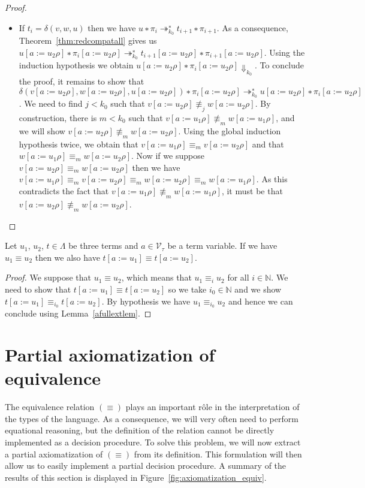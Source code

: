 \begin{proof}
\begin{itemize}
    \item If $t_i = δ(v,w,u)$ then we have ${u ∗ π_i} ↠_{k_0}^{∗} {t_{i+1} ∗
      π_{i+1}}$. As a consequence, Theorem~\ref{thm:redcompatall} gives us
      ${u[a := u_2ρ] ∗ π_i[a := u_2ρ]} ↠_{k_0}^{∗} {t_{i+1}[a := u_2ρ] ∗
      π_{i+1}[a := u_2ρ]}$. Using the induction hypothesis we obtain
      ${u[a := u_2ρ] ∗ π_i[a := u_2ρ]} {⇓}_{k_0}$. To conclude the proof, it
      remains to show that ${δ(v[a := u_2ρ],w[a := u_2ρ], u[a := u_2ρ]) ∗
      π_i[a := u_2ρ]} ↠_{k_0}^{∗} {u[a := u_2ρ] ∗ π_i[a := u_2ρ]}$.
      We need to find $j < k_0$ such that ${v[a := u_2ρ]} \not\equiv_j
      {w[a := u_2ρ]}$. By construction, there is $m < k_0$ such that
      ${v[a := u_1ρ]} \not\equiv_m {w[a := u_1ρ]}$, and we will show
      ${v[a := u_2ρ]} \not\equiv_m {w[a := u_2ρ]}$. Using the global
      induction hypothesis twice, we obtain that ${v[a := u_1ρ]} ≡_m
      {v[a := u_2ρ]}$ and that ${w[a := u_1ρ]} ≡_m {w[a := u_2ρ]}$.
      Now if we suppose ${v[a := u_2ρ]} ≡_m {w[a := u_2ρ]}$ then we
      have ${v[a := u_1ρ]} ≡_m {v[a := u_2ρ]} ≡_m {w[a := u_2ρ]} ≡_m
      {w[a := u_1ρ]}$. As this contradicts the fact that
      ${v[a := u_1ρ]} \not\equiv_m {w[a := u_1ρ]}$, it must be that
      ${v[a := u_2ρ]} \not\equiv_m {w[a := u_2ρ]}$.
  \end{itemize}
\end{proof}
\begin{theorem}\label{fullextterm}%
  Let $u_1$, $u_2$, $t ∈ Λ$ be three terms and $a ∈ \mathcal{V}_{τ}$ be a term
  variable. If we have $u_1 ≡ u_2$ then we also have
  ${t[a := u_1]} ≡ {t[a := u_2]}$.
\end{theorem}
\begin{proof}
  We suppose that $u_1 ≡ u_2$, which means that $u_1 ≡_i u_2$ for all
  $i ∈ \mathbb{N}$. We need to show that ${t[a := u_1]} ≡ {t[a := u_2]}$
  so we take $i_0 ∈ \mathbb{N}$ and we show ${t[a := u_1]} ≡_{i_0}
  {t[a := u_2]}$. By hypothesis we have $u_1 ≡_{i_0} u_2$ and hence we can
  conclude using Lemma~\ref{afullextlem}.
\end{proof}

\section{Partial axiomatization of equivalence}

The equivalence relation $(≡)$ plays an important rôle in the interpretation
of the types of the language. As a consequence, we will very often need to
perform equational reasoning, but the definition of the relation cannot be
directly implemented as a decision procedure. To solve this problem, we will
now extract a partial axiomatization of $(≡)$ from its definition. This
formulation will then allow us to easily implement a partial decision
procedure. A summary of the results of this section is displayed in
Figure~\ref{fig:axiomatization_equiv}.

